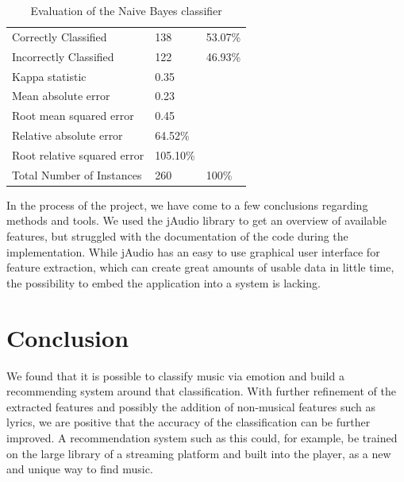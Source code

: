 \documentclass{sigchi-ext}
\begin{document}
\begin{table}
  \centering
  \begin{tabular}{@{}lll@{}}
    Correctly Classified          & 138       & 53.07\% \\
    Incorrectly Classified        & 122       & 46.93\% \\
    Kappa statistic               & 0.35      & \\
    Mean absolute error           & 0.23      & \\
    Root mean squared error       & 0.45      & \\
    Relative absolute error       & 64.52\%   & \\
    Root relative squared error   & 105.10\%  & \\
    Total Number of Instances     & 260       & 100\%
  \end{tabular}
  \caption{Evaluation of the Naive Bayes classifier}
\end{table}

In the process of the project, we have come to a few conclusions regarding methods and tools. We used the jAudio library to get an overview of available features, but struggled with the documentation of the code during the implementation. While jAudio has an easy to use graphical user interface for feature extraction, which can create great amounts of usable data in little time, the possibility to embed the application into a system is lacking.

\section{Conclusion}
We found that it is possible to classify music via emotion and build a recommending system around that classification. With further refinement of the extracted features and possibly the addition of non-musical features such as lyrics, we are positive that the accuracy of the classification can be further improved. A recommendation system such as this could, for example, be trained on the large library of a streaming platform and built into the player, as a new and unique way to find music.



\end{document}
